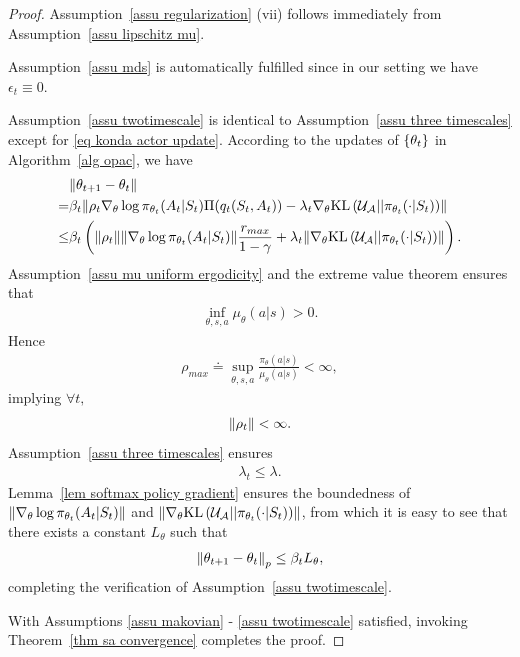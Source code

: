 \documentclass[twoside,11pt]{article}
\newcommand{\fA}{\mathcal{A}}
\newcommand{\fU}{\mathcal{U}}
\newcommand{\kl}[2]{\text{KL}\left(#1||#2\right)}
\numberwithin{assucounter}{section}
\begin{document}
\begin{proof}
  Assumption~\ref{assu regularization} (vii) follows immediately from Assumption~\ref{assu lipschitz mu}.

  Assumption~\ref{assu mds} is automatically fulfilled since in our setting we have $\epsilon_t \equiv 0$.

  Assumption~\ref{assu twotimescale} is identical to Assumption~\ref{assu three timescales} except for \eqref{eq konda actor update}.
  According to the updates of $\qty{\theta_t}$ in Algorithm~\ref{alg opac},
  we have
  \begin{align}
    &\norm{\theta_{t+1} - \theta_t} \\
    =& \beta_t \norm{\rho_t  \nabla_\theta \log \pi_{\theta_t}(A_t | S_t) \Pi (q_t(S_t, A_t)) - \lambda_t \nabla_{\theta} \kl{\fU_\fA}{\pi_{\theta_t}(\cdot | S_t)}} \\
    \leq& \beta_t \left( \norm{\rho_t} \norm{\nabla_\theta \log \pi_{\theta_t}(A_t | S_t)} \frac{r_{max}}{1 - \gamma} + \lambda_t \norm{\nabla_{\theta} \kl{\fU_\fA}{\pi_{\theta_t}(\cdot | S_t)}} \right).
  \end{align}
  Assumption~\ref{assu mu uniform ergodicity} and the extreme value theorem ensures that
  \begin{align}
    \inf_{\theta, s, a} \mu_{\theta}(a|s) > 0.
  \end{align}
  Hence
  \begin{align}
    \rho_{max} \doteq \sup_{\theta, s, a} \frac{\pi_\theta(a|s)}{\mu_\theta(a|s)} < \infty,
  \end{align}
  implying $\forall t,$
  \begin{align}
    \norm{\rho_t} < \infty.
  \end{align}
  Assumption~\ref{assu three timescales} ensures 
  \begin{align}
    \lambda_t \leq \lambda.
  \end{align}
  Lemma~\ref{lem softmax policy gradient} ensures the boundedness of $\norm{\nabla_\theta \log \pi_{\theta_t}(A_t | S_t)}$ and $\norm{\nabla_{\theta} \kl{\fU_\fA}{\pi_{\theta_t}(\cdot | S_t)}}$,
  from which it is easy to see that there exists a constant $L_\theta$ 
  such that 
  \begin{align}
    \label{eq ltheta}
    \norm{\theta_{t+1} - \theta_t}_p \leq \beta_t L_\theta,
  \end{align}
  completing the verification of Assumption~\ref{assu twotimescale}.

  With Assumptions \ref{assu makovian} - \ref{assu twotimescale} satisfied,
  invoking Theorem~\ref{thm sa convergence} completes the proof.
\end{proof}
\end{document}
